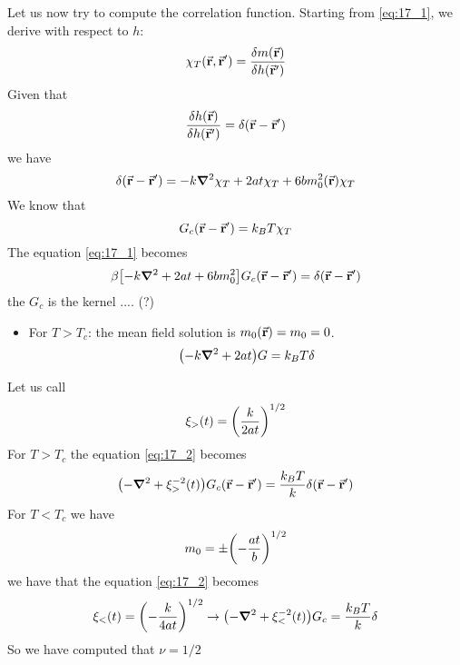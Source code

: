 \documentclass[../main/main.tex]{subfiles}
\begin{document}
Let us now try to compute the correlation function. Starting from \eqref{eq:17_1}, we derive with respect to \( h \):
\begin{equation}
  \chi _T (\va{r},\va{r}') = \frac{\delta m(\va{r})}{\delta h (\va{r}')}
\end{equation}
Given that
\begin{equation}
  \frac{\delta h (\va{r})}{\delta h (\va{r}')} = \delta (\va{r}-\va{r}')
\end{equation}
we have
\begin{equation}
  \delta  (\va{r} - \va{r}')  = - k \grad ^2 \chi _T + 2 a t  \chi _T  + 6 b m_0^2 (\va{r}) \chi _T
\end{equation}
We know that
\begin{equation}
  G_c (\va{r}-\va{r}') = k_B T \chi _T
\end{equation}
The equation \eqref{eq:17_1} becomes
\begin{equation}
  \beta \qty[-k \grad ^2 + 2 a t + 6 b m_0 ^2 ] G_c (\va{r}-\va{r}') = \delta (\va{r}- \va{r}')
\end{equation}
the \( G_c \) is the kernel .... (?)
\begin{itemize}
\item For \( T > T_c \): the mean field solution is \( m_0 (\va{r}) = m_0 = 0 \).
\begin{equation}
  \qty(-k \grad ^2 + 2 a t ) G = k_B T \delta
  \label{eq:17_2}
\end{equation}
\end{itemize}
Let us call
\begin{equation}
  \xi_> (t) = \qty(\frac{k}{2 a t })^{1/2}
\end{equation}
For \( T > T_c \) the equation \eqref{eq:17_2} becomes
\begin{equation}
  \qty(-\grad ^2 + \xi _> ^{-2} (t)) G_c (\va{r}-\va{r}') = \frac{k_B T}{k} \delta (\va{r}-\va{r}')
\end{equation}
For \( T < T_c \) we have
\begin{equation}
  m_0 = \pm \qty(-\frac{at}{b})^{1/2}
\end{equation}
we have that the equation \eqref{eq:17_2} becomes
\begin{equation}
  \xi _{<} (t) = \qty(- \frac{k}{4at})^{1/2}  \rightarrow \qty(-\grad ^2 + \xi _<^{-2} (t))G_c = \frac{k_B T}{k} \delta
\end{equation}
So we have computed that \( \nu = 1/2 \)
\end{document}
